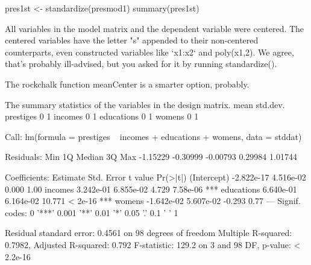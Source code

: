 \begin{Schunk}
\begin{Sinput}
 pres1st <- standardize(presmod1)
 summary(pres1st)
\end{Sinput}
\begin{Soutput}
All variables in the model matrix and the dependent variable
were centered. The centered variables have the letter "s" appended to their
non-centered counterparts, even constructed
variables like `x1:x2` and poly(x1,2). We agree, that's probably
ill-advised, but you asked for it by running standardize().

The rockchalk function meanCenter is a smarter option, probably. 

The summary statistics of the variables in the design matrix. 
           mean std.dev.
prestiges     0        1
incomes       0        1
educations    0        1
womens        0        1

Call:
lm(formula = prestiges ~ incomes + educations + womens, data = stddat)

Residuals:
     Min       1Q   Median       3Q      Max 
-1.15229 -0.30999 -0.00793  0.29984  1.01744 

Coefficients:
              Estimate Std. Error t value Pr(>|t|)    
(Intercept) -2.822e-17  4.516e-02   0.000     1.00    
incomes      3.242e-01  6.855e-02   4.729 7.58e-06 ***
educations   6.640e-01  6.164e-02  10.771  < 2e-16 ***
womens      -1.642e-02  5.607e-02  -0.293     0.77    
---
Signif. codes:  0 '***' 0.001 '**' 0.01 '*' 0.05 '.' 0.1 ' ' 1

Residual standard error: 0.4561 on 98 degrees of freedom
Multiple R-squared:  0.7982,	Adjusted R-squared:  0.792 
F-statistic: 129.2 on 3 and 98 DF,  p-value: < 2.2e-16
\end{Soutput}
\end{Schunk}

